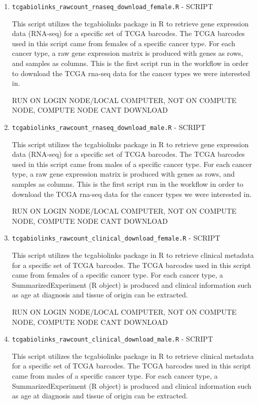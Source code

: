 \documentclass[10pt]{article}
\begin{document}
\begin{enumerate}
\item\texttt{tcgabiolinks\_rawcount\_rnaseq\_download\_female.R} - SCRIPT

This script utilizes the tcgabiolinks package in R to retrieve gene expression data (RNA-seq) for a specific set of TCGA barcodes. The TCGA barcodes used in this script came from females of a specific cancer type. For each cancer type, a raw gene expression matrix is produced with genes as rows, and samples as columns. This is the first script run in the workflow in order to download the TCGA rna-seq data for the cancer types we were interested in.

RUN ON LOGIN NODE/LOCAL COMPUTER, NOT ON COMPUTE NODE, COMPUTE NODE CANT DOWNLOAD

\item\texttt{tcgabiolinks\_rawcount\_rnaseq\_download\_male.R} - SCRIPT

This script utilizes the tcgabiolinks package in R to retrieve gene expression data (RNA-seq) for a specific set of TCGA barcodes. The TCGA barcodes used in this script came from males of a specific cancer type. For each cancer type, a raw gene expression matrix is produced with genes as rows, and samples as columns. This is the first script run in the workflow in order to download the TCGA rna-seq data for the cancer types we were interested in.

RUN ON LOGIN NODE/LOCAL COMPUTER, NOT ON COMPUTE NODE, COMPUTE NODE CANT DOWNLOAD

\item\texttt{tcgabiolinks\_rawcount\_clinical\_download\_female.R} - SCRIPT

This script utilizes the tcgabiolinks package in R to retrieve clinical metadata for a specific set of TCGA barcodes. The TCGA barcodes used in this script came from females of a specific cancer type. For each cancer type, a SummarizedExperiment (R object) is produced and clinical information such as age at diagnosis and tissue of origin can be extracted.

RUN ON LOGIN NODE/LOCAL COMPUTER, NOT ON COMPUTE NODE, COMPUTE NODE CANT DOWNLOAD

\item\texttt{tcgabiolinks\_rawcount\_clinical\_download\_male.R} - SCRIPT

This script utilizes the tcgabiolinks package in R to retrieve clinical metadata for a specific set of TCGA barcodes. The TCGA barcodes used in this script came from males of a specific cancer type. For each cancer type, a SummarizedExperiment (R object) is produced and clinical information such as age at diagnosis and tissue of origin can be extracted.


\end{enumerate}
\end{document}
